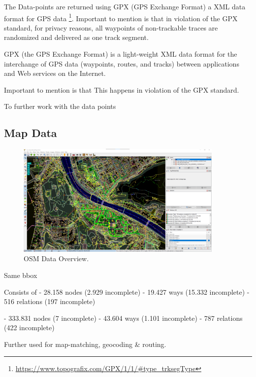 The Data-points are returned using GPX (GPS Exchange Format) a XML data format for GPS data \footnote{\url{https://www.topografix.com/GPX/1/1/#type_trksegType}}. Important to mention is that in violation of the GPX standard, for privacy reasons, all waypoints of non-trackable traces are randomized and delivered as one track segment. 

GPX (the GPS Exchange Format) is a light-weight XML data format for the interchange of GPS data (waypoints, routes, and tracks) between applications and Web services on the Internet. 

Important to mention is that This happens in violation of the GPX standard. 

To further work with the data points 

\subsection{Map Data}

\begin{figure}[t]
  \centering
  \includegraphics[width=0.9\textwidth]{images/DataOSM.png}
  \caption{
  OSM Data Overview.
  }
  \label{figure:MapData}
\end{figure}

Same bbox

Consists of
- 28.158 nodes (2.929 incomplete)
- 19.427 ways (15.332 incomplete)
- 516 relations (197 incomplete)

- 333.831 nodes (7 incomplete)
- 43.604 ways (1.101 incomplete)
- 787 relations (422 incomplete)


Further used for map-matching, geocoding & routing.

